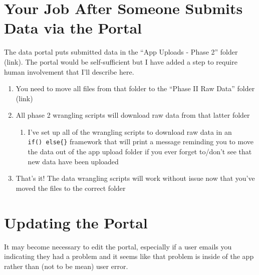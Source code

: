 \documentclass[
  letterpaper,
  DIV=11,
  numbers=noendperiod]{scrreprt}
\providecommand{\tightlist}{%
  \setlength{\itemsep}{0pt}\setlength{\parskip}{0pt}}\usepackage{longtable,booktabs,array}
\begin{document}
\section{Your Job After Someone Submits Data via the
Portal}\label{your-job-after-someone-submits-data-via-the-portal}

The data portal puts submitted data in the ``App Uploads - Phase 2''
folder (link). The portal would be self-sufficient but I have added a
step to require human involvement that I'll describe here.

\begin{enumerate}
\def\labelenumi{\arabic{enumi}.}
\item
  You need to move all files from that folder to the ``Phase II Raw
  Data'' folder (link)
\item
  All phase 2 wrangling scripts will download raw data from that latter
  folder

  \begin{enumerate}
  \def\labelenumii{\alph{enumii}.}
  \tightlist
  \item
    I've set up all of the wrangling scripts to download raw data in an
    \texttt{if()\ else\{\}} framework that will print a message
    reminding you to move the data out of the app upload folder if you
    ever forget to/don't see that new data have been uploaded
  \end{enumerate}
\item
  That's it! The data wrangling scripts will work without issue now that
  you've moved the files to the correct folder
\end{enumerate}

\section{Updating the Portal}\label{updating-the-portal}

It may become necessary to edit the portal, especially if a user emails
you indicating they had a problem and it seems like that problem is
inside of the app rather than (not to be mean) user error.
\end{document}

